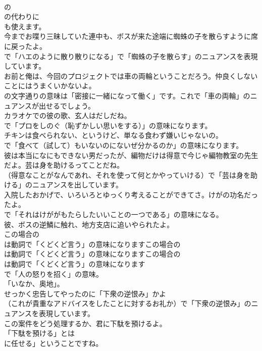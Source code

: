\documentclass[8pt]{extreport}
\begin{document}
\begin{CJK}{UTF8}{min}
\\	の 
\\	の代わりに 
\\	も使えます。	
\\	今までお喋り三昧していた連中も、ボスが来た途端に蜘蛛の子を散らすように席に戻ったよ。 
\\	で「ハエのように散り散りになる」で「蜘蛛の子を散らす」のニュアンスを表現しています。	
\\	お前と俺は、今回のプロジェクトでは車の両輪ということだろう。仲良くしないことにはうまくいかないよ。 
\\	の文字通りの意味は「密接に一緒になって働く」です。これで「車の両輪」のニュアンスが出せるでしょう。	
\\	カラオケでの彼の歌、玄人はだしだね。 
\\	で「プロをしのぐ（恥ずかしい思いをする）」の意味になります。	
\\	チキンは食べられない、というけど、単なる食わず嫌いじゃないの。 
\\	で「食べて（試して）もいないのにないぜ分かるのか」の意味になります。	
\\	彼は本当になにもできない男だったが、編物だけは得意で今じゃ編物教室の先生だよ。芸は身を助けるってことだね。 
\\	（得意なことがなんであれ、それを使って何とかやっていける）で「芸は身を助ける」のニュアンスを出しています。	
\\	入院したおかげで、いろいろとゆっくり考えることができてさ。けがの功名だったよ。 
\\	で「それはけががもたらしたいいことの一つである」の意味になる。	
\\	彼、ボスの逆鱗に触れ、地方支店に追いやられたよ。 
\\	この場合の
\\	は動詞で「くどくど言う」の意味になりますこの場合の
\\	は動詞で「くどくど言う」の意味になりますこの場合の
\\	は動詞で「くどくど言う」の意味になります
\\	で「人の怒りを招く」の意味。
\\	「いなか、奥地」。	
\\	せっかく忠告してやったのに「下衆の逆恨み」かよ 
\\	（これが貴重なアドバイスをしたことに対するお礼か）で「下衆の逆恨み」のニュアンスを表現しています。	
\\	この案件をどう処理するか、君に下駄を預けるよ。 
\\	「下駄を預ける」とは
\\	に任せる」ということですね。	

\end{CJK}
\end{document}
